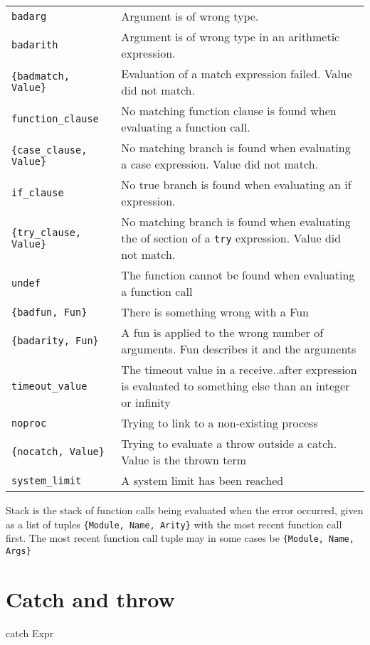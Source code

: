 \begin{center}
\begin{tabular}{|>{\raggedright}p{100pt}|>{\raggedright}p{226pt}|}
\hline
\multicolumn{2}{|p{326pt}|}{Exit reasons}\tabularnewline
\hline
\texttt{badarg}  & Argument is of wrong type. \tabularnewline
\hline
\texttt{badarith}  & Argument is of wrong type in an arithmetic expression. \tabularnewline
\hline
\texttt{\{badmatch, Value\}}  & Evaluation of a match expression failed. Value did not match.
\tabularnewline
\hline
\texttt{function\_clause}  & No matching function clause is found when evaluating a function
call. \tabularnewline
\hline
\texttt{\{case\_clause, Value\}}  & No matching branch is found when evaluating a case expression.
Value did not match. \tabularnewline
\hline
\texttt{if\_clause}  & No true branch is found when evaluating an if expression. \tabularnewline
\hline
\texttt{\{try\_clause, Value\}}  & No matching branch is found when evaluating the of section
of a \texttt{try} expression. Value did not match. \tabularnewline
\hline
\texttt{undef}  & The function cannot be found when evaluating a function call\tabularnewline
\hline
\texttt{\{badfun, Fun\}}  & There is something wrong with a Fun\tabularnewline
\hline
\texttt{\{badarity, Fun\}}  & A fun is applied to the wrong number of arguments. Fun describes
it and the arguments\tabularnewline
\hline
\texttt{timeout\_value}  & The timeout value in a receive..after expression is evaluated
to something else than an integer or infinity\tabularnewline
\hline
\texttt{noproc}  & Trying to link to a non-existing process\tabularnewline
\hline
\texttt{\{nocatch, Value\}}  & Trying to evaluate a throw outside a catch. Value is the thrown
term\tabularnewline
\hline
\texttt{system\_limit}  & A system limit has been reached\tabularnewline
\hline
\end{tabular}
\end{center}

Stack is the stack of function calls being evaluated when the error
occurred, given as a list of tuples \texttt{\{Module, Name, Arity\}}
with the most recent function call first.  The most recent function
call tuple may in some cases be \texttt{\{Module, Name, Args\}}


\section{Catch and throw}
\label{errorhandling:catchthrow}
\begin{erlang}
catch Expr
\end{erlang}

